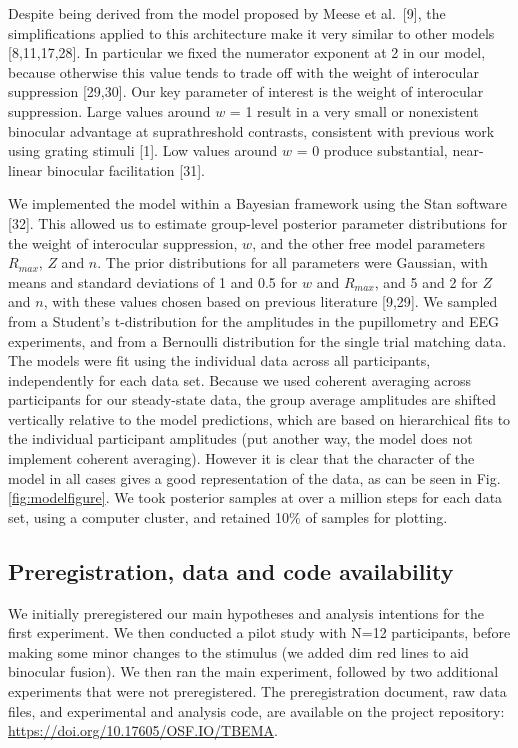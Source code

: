 \documentclass[
]{article}
\begin{document}
Despite being derived from the model proposed by Meese et al.~{[}9{]}, the simplifications applied to this architecture make it very similar to other models {[}8,11,17,28{]}. In particular we fixed the numerator exponent at 2 in our model, because otherwise this value tends to trade off with the weight of interocular suppression {[}29,30{]}. Our key parameter of interest is the weight of interocular suppression. Large values around \(w\) = 1 result in a very small or nonexistent binocular advantage at suprathreshold contrasts, consistent with previous work using grating stimuli {[}1{]}. Low values around \(w\) = 0 produce substantial, near-linear binocular facilitation {[}31{]}.

We implemented the model within a Bayesian framework using the Stan software {[}32{]}. This allowed us to estimate group-level posterior parameter distributions for the weight of interocular suppression, \(w\), and the other free model parameters \(R_{max}\), \(Z\) and \(n\). The prior distributions for all parameters were Gaussian, with means and standard deviations of 1 and 0.5 for \(w\) and \(R_{max}\), and 5 and 2 for \(Z\) and \(n\), with these values chosen based on previous literature {[}9,29{]}. We sampled from a Student's t-distribution for the amplitudes in the pupillometry and EEG experiments, and from a Bernoulli distribution for the single trial matching data. The models were fit using the individual data across all participants, independently for each data set. Because we used coherent averaging across participants for our steady-state data, the group average amplitudes are shifted vertically relative to the model predictions, which are based on hierarchical fits to the individual participant amplitudes (put another way, the model does not implement coherent averaging). However it is clear that the character of the model in all cases gives a good representation of the data, as can be seen in Fig. \ref{fig:modelfigure}. We took posterior samples at over a million steps for each data set, using a computer cluster, and retained 10\% of samples for plotting.

\hypertarget{preregistration-data-and-code-availability}{%
\subsection{Preregistration, data and code availability}\label{preregistration-data-and-code-availability}}

We initially preregistered our main hypotheses and analysis intentions for the first experiment. We then conducted a pilot study with N=12 participants, before making some minor changes to the stimulus (we added dim red lines to aid binocular fusion). We then ran the main experiment, followed by two additional experiments that were not preregistered. The preregistration document, raw data files, and experimental and analysis code, are available on the project repository: \url{https://doi.org/10.17605/OSF.IO/TBEMA}.
\end{document}
